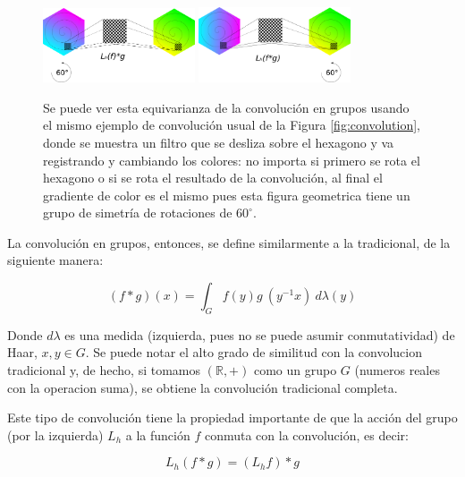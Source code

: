 \documentclass[12pt,letterpaper,final, openany]{scrbook}
\begin{document}
\begin{figure}[h!]
    \centering
    \includegraphics[width=0.4\textwidth]{aplicacion_en_f.png}
    \includegraphics[width=0.4\textwidth]{aplicacion_en_fg.png}
    \caption{Se puede ver esta equivarianza de la convolución en grupos usando el mismo ejemplo de convolución usual de la Figura \ref{fig:convolution}, donde se muestra un filtro que se desliza sobre el hexagono y va registrando y cambiando los colores: no importa si primero se rota el hexagono o si se rota el resultado de la convolución, al final el gradiente de color es el mismo pues esta figura geometrica tiene un grupo de simetría de rotaciones de $60^{\circ}$.}
    \label{fig:conv_equivariant}
\end{figure}

La convolución en grupos, entonces, se define similarmente a la tradicional, de la siguiente manera:

\begin{equation}
(f * g)(x) = \int_{G} f(y)g\ (y^{-1} x)\  d\lambda(y)
\end{equation}

Donde $d\lambda$ es una medida (izquierda, pues no se puede asumir conmutatividad) de Haar, $x,y \in G$. Se puede notar el alto grado de similitud con la convolucion tradicional y, de hecho, si tomamos $(\mathbb{R},+)$ como un grupo $G$ (numeros reales con la operacion suma), se obtiene la convolución tradicional completa.

Este tipo de convolución tiene la propiedad importante de que la acción del grupo (por la izquierda) $L_{h}$ a la función $f$ conmuta con la convolución, es decir:

\begin{equation}
L_{h}(f * g) = (L_{h}f) * g
\end{equation}
\end{document}
